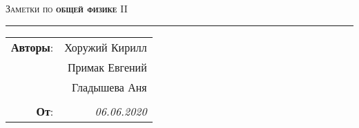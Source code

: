 \phantom{42}

\begin{center}
    \LARGE \textsc{Заметки по \textbf{общей физике} II}
\end{center}

\hrule

\phantom{42}


\begin{flushright}
    \begin{tabular}{rr}
        \textbf{Авторы}: 
        & Хоружий Кирилл \\
        & Примак Евгений \\
        & Гладышева Аня \\
        &\\
        \textbf{От}: &
        \textit{06.06.2020}\\
    \end{tabular}
\end{flushright}






\thispagestyle{empty}
\tableofcontents
\newpage